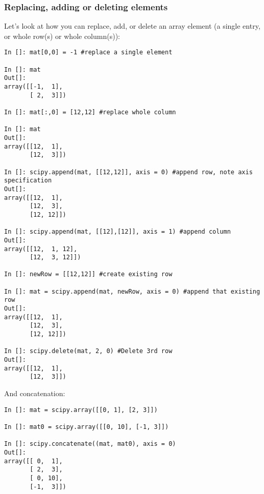 \subsubsection{Replacing, adding or deleting elements} 

Let's look at how you can replace, add, or delete an array element (a 
single entry, or whole row(s) or whole column(s)):

\begin{lstlisting}
In []: mat[0,0] = -1 #replace a single element

In []: mat
Out[]: 
array([[-1,  1],
       [ 2,  3]])
       
In []: mat[:,0] = [12,12] #replace whole column

In []: mat
Out[]: 
array([[12,  1],
       [12,  3]])

In []: scipy.append(mat, [[12,12]], axis = 0) #append row, note axis 
specification
Out[]: 
array([[12,  1],
       [12,  3],
       [12, 12]])

In []: scipy.append(mat, [[12],[12]], axis = 1) #append column
Out[]: 
array([[12,  1, 12],
       [12,  3, 12]])

In []: newRow = [[12,12]] #create existing row

In []: mat = scipy.append(mat, newRow, axis = 0) #append that existing row
Out[]: 
array([[12,  1],
       [12,  3],
       [12, 12]])

In []: scipy.delete(mat, 2, 0) #Delete 3rd row
Out[]: 
array([[12,  1],
       [12,  3]])
\end{lstlisting}

And concatenation:

\begin{lstlisting}
In []: mat = scipy.array([[0, 1], [2, 3]])

In []: mat0 = scipy.array([[0, 10], [-1, 3]])

In []: scipy.concatenate((mat, mat0), axis = 0)
Out[]: 
array([[ 0,  1],
       [ 2,  3],
       [ 0, 10],
       [-1,  3]])
\end{lstlisting}
 
